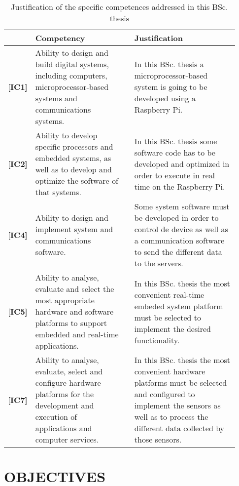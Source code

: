 \documentclass{pre-tfg}
\begin{document}
\begin{table}[hp]
  \centering
  \caption{Justification of the specific competences addressed in this BSc. thesis}
  \label{tab:competencias}

  \begin{tabular}{m{0.06\linewidth}m{0.4\linewidth}m{0.01\linewidth}m{0.46\linewidth}}
    &\textbf{Competency} && \textbf{Justification} \\
    \hline

    \textbf{[IC1]}& Ability to design and build digital systems, including computers, microprocessor-based systems and communications systems.&& In this BSc. thesis a microprocessor-based system is going to be developed using a Raspberry Pi. \\
    
    \textbf{[IC2]}& Ability to develop specific processors and embedded systems, as well as to develop and optimize the software of that systems.&& In this BSc. thesis some software code has to be developed and optimized in order to execute in real time on the Raspberry Pi. \\
    
    \textbf{[IC4]}& Ability to design and implement system and communications software.&& Some system software must be developed in order to control de device as well as a communication software to send the different data to the servers. \\
    
    \textbf{[IC5]}& Ability to analyse, evaluate and select the most appropriate hardware and software platforms to support embedded and real-time applications.&& In this BSc. thesis the most convenient real-time embeded system platform must be selected to implement the desired functionality. \\
    
    \textbf{[IC7]}& Ability to analyse, evaluate, select and configure hardware platforms for the development and execution of applications and computer services.&& In this BSc. thesis the most convenient hardware platforms must be selected and configured to implement the sensors as well as to process the different data collected by those sensors. \\
    
    \hline
  \end{tabular}
\end{table}


\section{OBJECTIVES}
\end{document}

